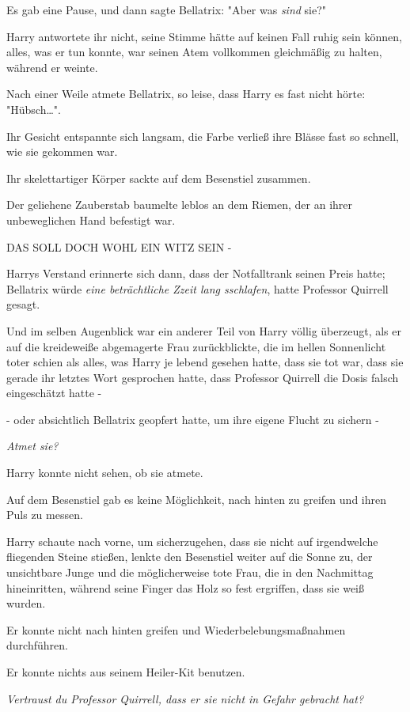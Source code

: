 {Es gab eine Pause, und dann sagte Bellatrix: "Aber was \emph{sind} sie?"

Harry antwortete ihr nicht, seine Stimme hätte auf keinen Fall ruhig sein können, alles, was er tun konnte, war seinen Atem vollkommen gleichmäßig zu halten, während er weinte.

Nach einer Weile atmete Bellatrix, so leise, dass Harry es fast nicht hörte: "Hübsch…".

Ihr Gesicht entspannte sich langsam, die Farbe verließ ihre Blässe fast so schnell, wie sie gekommen war.

Ihr skelettartiger Körper sackte auf dem Besenstiel zusammen.

Der geliehene Zauberstab baumelte leblos an dem Riemen, der an ihrer unbeweglichen Hand befestigt war.

DAS SOLL DOCH WOHL EIN WITZ SEIN -

Harrys Verstand erinnerte sich dann, dass der Notfalltrank seinen Preis hatte; Bellatrix würde \emph{eine beträchtliche Zzeit lang sschlafen}, hatte Professor Quirrell gesagt.

Und im selben Augenblick war ein anderer Teil von Harry völlig überzeugt, als er auf die kreideweiße abgemagerte Frau zurückblickte, die im hellen Sonnenlicht toter schien als alles, was Harry je lebend gesehen hatte, dass sie tot war, dass sie gerade ihr letztes Wort gesprochen hatte, dass Professor Quirrell die Dosis falsch eingeschätzt hatte -

- oder absichtlich Bellatrix geopfert hatte, um ihre eigene Flucht zu sichern -

\emph{Atmet sie?}

Harry konnte nicht sehen, ob sie atmete.

Auf dem Besenstiel gab es keine Möglichkeit, nach hinten zu greifen und ihren Puls zu messen.

Harry schaute nach vorne, um sicherzugehen, dass sie nicht auf irgendwelche fliegenden Steine stießen, lenkte den Besenstiel weiter auf die Sonne zu, der unsichtbare Junge und die möglicherweise tote Frau, die in den Nachmittag hineinritten, während seine Finger das Holz so fest ergriffen, dass sie weiß wurden.

Er konnte nicht nach hinten greifen und Wiederbelebungsmaßnahmen durchführen.

Er konnte nichts aus seinem Heiler-Kit benutzen.

\emph{Vertraust du Professor Quirrell, dass er sie nicht in Gefahr gebracht hat?}

}
